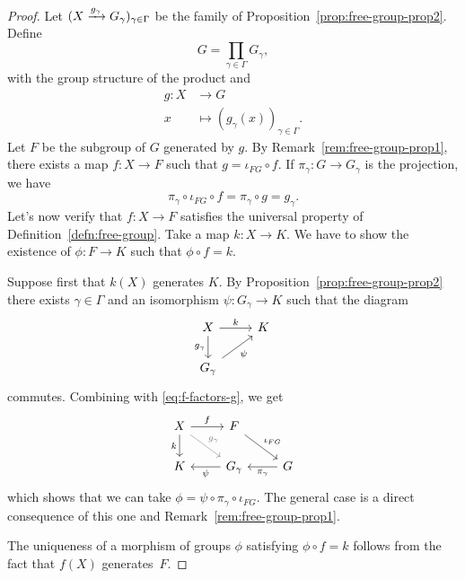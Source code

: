\begin{proof}
    Let $(X\xrightarrow{g_\gamma}G_\gamma)_{\gamma\in\Gamma}$ be the family of Proposition~\ref{prop:free-group-prop2}. Define
    $$
        G = \prod_{\gamma\in\Gamma}G_\gamma,
    $$
    with the group structure of the product and
    \begin{align*}
        g\colon X&\to G\\
        x&\mapsto(g_\gamma(x))_{\gamma\in\Gamma}.
    \end{align*}
    Let $F$ be the subgroup of $G$ generated by $g$. By Remark~\ref{rem:free-group-prop1}, there exists a map $f\colon X\to F$ such that $g=\iota_{FG}\circ f$. If $\pi_\gamma\colon G\to G_\gamma$ is the projection, we have
    \begin{equation}\label{eq:f-factors-g}
        \pi_\gamma\circ\iota_{FG}\circ f= \pi_\gamma\circ g=g_\gamma.
    \end{equation}
    Let's now verify that $f\colon X\to F$ satisfies the universal property of Definition~\ref{defn:free-group}. Take a map $k\colon X\to K$. We have to show the existence of $\phi\colon F\to K$ such that $\phi\circ f=k$.
    
    Suppose first that $k(X)$ generates $K$. By Proposition~\ref{prop:free-group-prop2} there exists $\gamma\in\Gamma$ and an isomorphism $\psi\colon G_\gamma\to K$ such that the diagram
    $$
        \begin{tikzcd}
            X
                    \arrow[r,"k"]
                    \arrow[d,"g_\gamma"']
                &K\\
            G_\gamma
                    \arrow[ru,"\psi"']
        \end{tikzcd}
    $$
    commutes. Combining with \eqref{eq:f-factors-g}, we get
    $$
        \begin{tikzcd}
        X
                \arrow[d,"k"']
                \arrow[rd,"g_\gamma",color=gray]
                \arrow[r,"f"]
            &F\arrow[rd,"\iota_{FG}"]\\
        K
            &G_\gamma
                \arrow[l,"\psi"]
            &G
                \arrow[l,"\pi_\gamma"]
        \end{tikzcd}
    $$
    which shows that we can take $\phi=\psi\circ\pi_\gamma\circ\iota_{FG}$. The general case is a direct consequence of this one and Remark~\ref{rem:free-group-prop1}.

    The uniqueness of a morphism of groups $\phi$ satisfying $\phi\circ f=k$ follows from the fact that $f(X)$ generates~$F$.
\end{proof}


